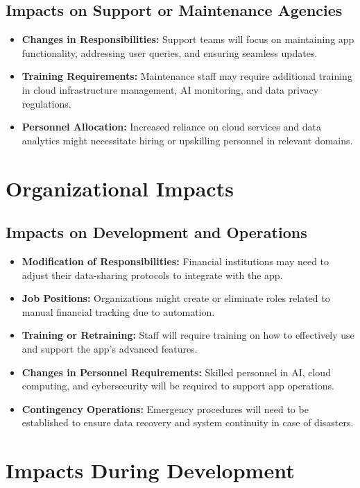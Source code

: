 \subsection{Impacts on Support or Maintenance Agencies}
\begin{itemize}
    \item \textbf{Changes in Responsibilities:} Support teams will focus on maintaining app functionality, addressing user queries, and ensuring seamless updates.
    \item \textbf{Training Requirements:} Maintenance staff may require additional training in cloud infrastructure management, AI monitoring, and data privacy regulations.
    \item \textbf{Personnel Allocation:} Increased reliance on cloud services and data analytics might necessitate hiring or upskilling personnel in relevant domains.
\end{itemize}

\section{Organizational Impacts}

\subsection{Impacts on Development and Operations}
\begin{itemize}
    \item \textbf{Modification of Responsibilities:} Financial institutions may need to adjust their data-sharing protocols to integrate with the app.
    \item \textbf{Job Positions:} Organizations might create or eliminate roles related to manual financial tracking due to automation.
    \item \textbf{Training or Retraining:} Staff will require training on how to effectively use and support the app’s advanced features.
    \item \textbf{Changes in Personnel Requirements:} Skilled personnel in AI, cloud computing, and cybersecurity will be required to support app operations.
    \item \textbf{Contingency Operations:} Emergency procedures will need to be established to ensure data recovery and system continuity in case of disasters.
\end{itemize}

\section{Impacts During Development}

